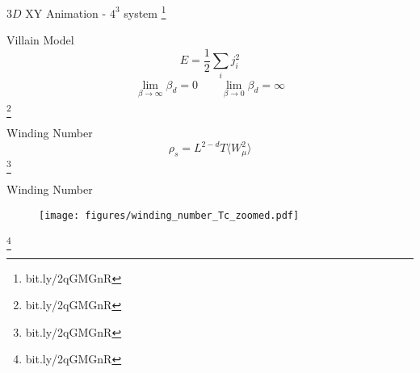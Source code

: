 \documentclass[10pt]{beamer}
\newcommand\blfootnote[1]{%
  \begingroup
  \renewcommand\thefootnote{}\footnote{#1}%
  \addtocounter{footnote}{-1}%
  \endgroup
}
\begin{document}
\begin{frame}{$3D$ XY Animation - $4^3$ system}
   \blfootnote{bit.ly/2qGMGnR}
\end{frame}

\begin{frame}{Villain Model}
    \begin{equation*}
        E = \frac{1}{2} \sum_i j_i^2
    \end{equation*}
    \begin{align*}
        \lim_{\beta \to \infty} \beta_d = 0 \qquad \lim_{\beta \to 0} \beta_d = \infty
    \end{align*}
    \blfootnote{bit.ly/2qGMGnR}
\end{frame}

\begin{frame}{Winding Number}
    \begin{equation*}
        \rho_s = L^{2 - d} T \langle W_\mu^2 \rangle 
    \end{equation*}
    \blfootnote{bit.ly/2qGMGnR}
\end{frame}

\begin{frame}{Winding Number}
    \begin{figure}[h!]
        \centering
            \texttt{[image: figures/winding\_number\_Tc\_zoomed.pdf]}
    \end{figure}
    \blfootnote{bit.ly/2qGMGnR}
\end{frame}
\end{document}
